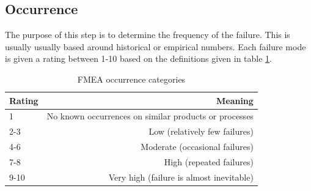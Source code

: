 \documentclass[10pt,oneside]{book}                  %
\begin{document}
\subsection{Occurrence}
\label{sec:fmea_occurrence}
The purpose of this step is to determine the frequency of the failure. This is usually usually based around historical or empirical numbers. Each failure mode is given a rating between 1-10 based on the definitions given in table \ref{table:fmea_occurrence}.

\begin{table}[h]
\centering
    \begin{tabular}{ | l | r | }
    \hline
    Rating & Meaning \\ \hline \hline
    1      & No known occurrences on similar products or processes  \\ \hline
    2-3    & Low (relatively few failures) \\ \hline
    4-6    & Moderate (occasional failures) \\ \hline
    7-8    & High (repeated failures) \\ \hline
    9-10   & Very high (failure is almost inevitable) \\ \hline
    \end{tabular}
\caption{FMEA occurrence categories}
\label{table:fmea_occurrence}
\end{table}
\end{document}
